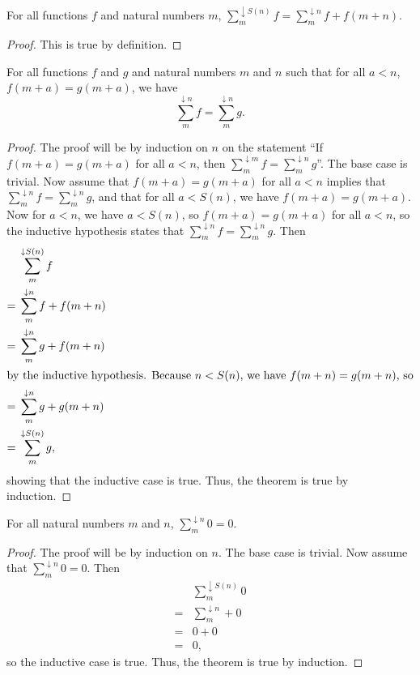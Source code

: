 \documentclass[../math.tex]{subfiles}
\begin{document}
\begin{theorem}
    For all functions $f$ and natural numbers $m$, $\sum_m^{\downarrow S(n)} f =
    \sum_m^{\downarrow n} f + f(m + n)$.
\end{theorem}
\begin{proof}
    This is true by definition.
\end{proof}

\begin{theorem}
    For all functions $f$ and $g$ and natural numbers $m$ and $n$ such that for
    all $a < n$, $f(m + a) = g(m + a)$, we have
    \[
        \sum_m^{\downarrow n} f = \sum_m^{\downarrow n} g.
    \]
\end{theorem}
\begin{proof}
    The proof will be by induction on $n$ on the statement ``If $f(m + a) = g(m
    + a)$ for all $a < n$, then $\sum_m^{\downarrow m} f = \sum_m^{\downarrow n}
    g$''.  The base case is trivial.  Now assume that $f(m + a) = g(m + a)$ for
    all $a < n$ implies that $\sum_m^{\downarrow n} f = \sum_m^{\downarrow n}
    g$, and that for all $a < S(n)$, we have $f(m + a) = g(m + a)$.  Now for $a
    < n$, we have $a < S(n)$, so $f(m + a) = g(m + a)$ for all $a < n$, so the
    inductive hypothesis states that $\sum_m^{\downarrow n} f =
    \sum_m^{\downarrow n} g$.  Then
    \begin{align*}
           & \sum_m^{\downarrow S(n)} f \\
        ={}& \sum_m^{\downarrow n} f + f(m + n) \\
        ={}& \sum_m^{\downarrow n} g + f(m + n) \\
    \intertext{by the inductive hypothesis.  Because $n < S(n)$, we have $f(m +
    n) = g(m + n)$, so}
        ={}& \sum_m^{\downarrow n} g + g(m + n) \\
        ={}& \sum_m^{\downarrow S(n)} g,
    \end{align*}
    showing that the inductive case is true.  Thus, the theorem is true by
    induction.
\end{proof}

\begin{theorem}
    For all natural numbers $m$ and $n$, $\sum_m^{\downarrow n} 0 = 0$.
\end{theorem}
\begin{proof}
    The proof will be by induction on $n$.  The base case is trivial.  Now
    assume that $\sum_m^{\downarrow n} 0 = 0$.  Then
    \begin{align*}
           & \sum_m^{\downarrow S(n)} 0 \\
        ={}& \sum_m^{\downarrow n} + 0 \\
        ={}& 0 + 0 \\
        ={}& 0,
    \end{align*}
    so the inductive case is true.  Thus, the theorem is true by induction.
\end{proof}
\end{document}

